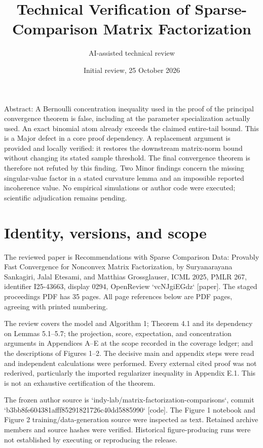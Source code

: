 \documentclass[10pt]{article}
\title{Technical Verification of
Sparse-Comparison Matrix Factorization}
\author{AI-assisted technical review}
\date{Initial review, 25 October 2026}
\begin{document}
\maketitle
Abstract: A Bernoulli concentration inequality used in the proof of the principal convergence theorem is false, including at the parameter specialization actually used. An exact binomial atom already exceeds the claimed entire-tail bound. This is a Major defect in a core proof dependency. A replacement argument is provided and locally verified: it restores the downstream matrix-norm bound without changing its stated sample threshold. The final convergence theorem is therefore not refuted by this finding. Two Minor findings concern the missing singular-value factor in a stated curvature lemma and an impossible reported incoherence value. No empirical simulations or author code were executed; scientific adjudication remains pending.\par
\section*{Identity, versions, and scope}
The reviewed paper is Recommendations with Sparse Comparison Data: Provably Fast Convergence for Nonconvex Matrix Factorization, by Suryanarayana Sankagiri, Jalal Etesami, and Matthias Grossglauser, ICML 2025, PMLR 267, identifier I25-43663, display 0294, OpenReview `vcNJgiEGdz` [paper]. The staged proceedings PDF has 35 pages. All page references below are PDF pages, agreeing with printed numbering.\par
The review covers the model and Algorithm 1; Theorem 4.1 and its dependency on Lemmas 5.1–5.7; the projection, score, expectation, and concentration arguments in Appendices A–E at the scope recorded in the coverage ledger; and the descriptions of Figures 1–2. The decisive main and appendix steps were read and independent calculations were performed. Every external cited proof was not rederived, particularly the imported regularizer inequality in Appendix E.1. This is not an exhaustive certification of the theorem.\par
The frozen author source is `indy-lab/matrix-factorization-comparisons`, commit `b3bb8fe604381afff85291821726c40dd5885990` [code]. The Figure 1 notebook and Figure 2 training/data-generation source were inspected as text. Retained archive members and source hashes were verified. Historical figure-producing runs were not established by executing or reproducing the release.\par
\end{document}
